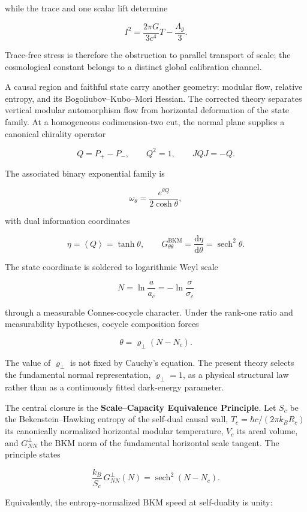 \documentclass[
  11pt,
  letterpaper,
]{article}
\begin{document}
while the trace and one scalar lift determine

\[
\boxed{
I^2=\frac{2\pi G}{3c^4}T-\frac{\Lambda_g}{3}.
}
\]

Trace-free stress is therefore the obstruction to parallel transport of
scale; the cosmological constant belongs to a distinct global
calibration channel.

A causal region and faithful state carry another geometry: modular flow,
relative entropy, and its Bogoliubov--Kubo--Mori Hessian. The corrected
theory separates vertical modular automorphism flow from horizontal
deformation of the state family. At a homogeneous codimension-two cut,
the normal plane supplies a canonical chirality operator

\[
Q=P_+-P_-,
\qquad
Q^2=1,
\qquad
JQJ=-Q.
\]

The associated binary exponential family is

\[
\omega_\theta=\frac{e^{\theta Q}}{2\cosh\theta},
\]

with dual information coordinates

\[
\eta=\left\langle Q\right\rangle=\tanh\theta,
\qquad
G^{\mathrm{BKM}}_{\theta\theta}=\frac{\mathrm d\eta}{\mathrm d\theta}=\operatorname{sech}^2\theta.
\]

The state coordinate is soldered to logarithmic Weyl scale

\[
N=\ln\frac{a}{a_c}=-\ln\frac{\sigma}{\sigma_c}
\]

through a measurable Connes-cocycle character. Under the rank-one ratio
and measurability hypotheses, cocycle composition forces

\[
\theta=\varrho_\perp(N-N_c).
\]

The value of \(\varrho_\perp\) is not fixed by Cauchy's equation. The
present theory selects the fundamental normal representation,
\(\varrho_\perp=1\), as a physical structural law rather than as a
continuously fitted dark-energy parameter.

The central closure is the \textbf{Scale--Capacity Equivalence
Principle}. Let \(S_c\) be the Bekenstein--Hawking entropy of the
self-dual causal wall, \(T_c=\hbar c/(2\pi k_BR_c)\) its canonically
normalized horizontal modular temperature, \(V_c\) its areal volume, and
\(G^{\perp}_{NN}\) the BKM norm of the fundamental horizontal scale
tangent. The principle states

\[
\boxed{
\frac{k_B}{S_c}\,G^{\perp}_{NN}(N)
=\operatorname{sech}^2(N-N_c).
}
\]

Equivalently, the entropy-normalized BKM speed at self-duality is unity:
\end{document}
